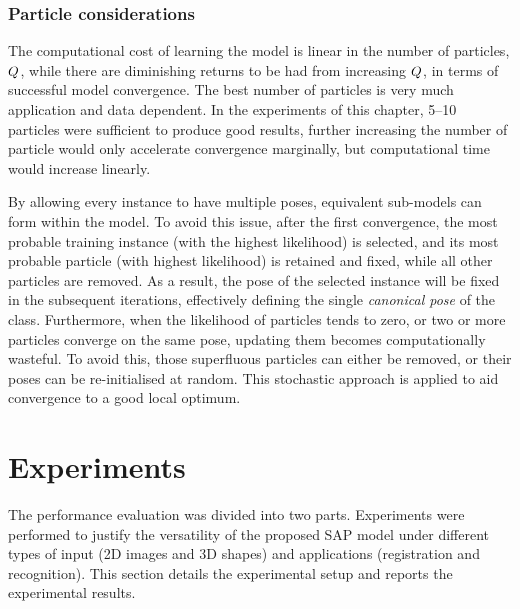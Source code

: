 \subsubsection{Particle considerations}
The computational cost of learning the model is linear in the number of particles, $Q$, while there are diminishing returns to be had from increasing $Q$, in terms of successful model convergence. The best number of particles is very much application and data dependent. In the experiments of this chapter, 5--10 particles were sufficient to produce good results, further increasing the number of particle would only accelerate convergence marginally, but computational time would increase linearly. 

By allowing every instance to have multiple poses, equivalent sub-models can form within the model.
To avoid this issue, after the first convergence, the most probable training instance (with the highest likelihood) is selected, and its most probable particle (with highest likelihood) is retained and fixed, while all other particles are removed. As a result, the pose of the selected instance will be fixed in the subsequent iterations, effectively defining the single \emph{canonical pose} of the class. 
Furthermore, when the likelihood of particles tends to zero, or two or more particles converge on the same pose, updating them becomes computationally wasteful. To avoid this, those superfluous particles can either be removed, or their poses can be re-initialised at random. This stochastic approach is applied to aid convergence to a good local optimum.  


\section{Experiments}
\label{sec/reg/experiments}



The performance evaluation was divided into two parts. Experiments were performed to justify the versatility of the proposed SAP model under different types of input (2D images and 3D shapes) and applications (registration and recognition). This section details the experimental setup and reports the experimental results.

